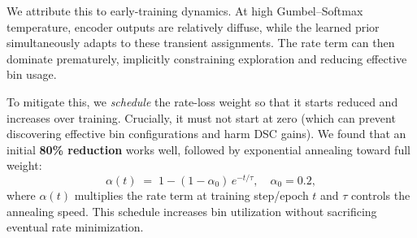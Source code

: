 We attribute this to early-training dynamics. At high Gumbel–Softmax temperature, encoder outputs are relatively diffuse, while the learned prior simultaneously adapts to these transient assignments. The rate term can then dominate prematurely, implicitly constraining exploration and reducing effective bin usage.

To mitigate this, we \emph{schedule} the rate-loss weight so that it starts reduced and increases over training. Crucially, it must not start at zero (which can prevent discovering effective bin configurations and harm DSC gains). We found that an initial \textbf{80\% reduction} works well, followed by exponential annealing toward full weight:
\[
\alpha(t) \;=\; 1 - (1 - \alpha_0)\,e^{-t/\tau},
\quad \alpha_0 = 0.2,
\]
where $\alpha(t)$ multiplies the rate term at training step/epoch $t$ and $\tau$ controls the annealing speed. This schedule increases bin utilization without sacrificing eventual rate minimization.